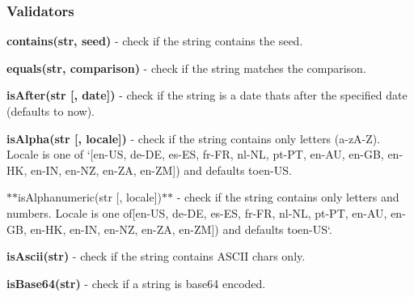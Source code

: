 \subsubsection*{Validators}


\begin{DoxyItemize}
\item {\bfseries contains(str, seed)} -\/ check if the string contains the seed.
\item {\bfseries equals(str, comparison)} -\/ check if the string matches the comparison.
\item {\bfseries is\+After(str \mbox{[}, date\mbox{]})} -\/ check if the string is a date that\textquotesingle{}s after the specified date (defaults to now).
\item {\bfseries is\+Alpha(str \mbox{[}, locale\mbox{]})} -\/ check if the string contains only letters (a-\/z\+A-\/Z). Locale is one of `\mbox{[}\textquotesingle{}en-\/\+US\textquotesingle{}, \textquotesingle{}de-\/\+DE\textquotesingle{}, \textquotesingle{}es-\/\+ES\textquotesingle{}, \textquotesingle{}fr-\/\+FR\textquotesingle{}, \textquotesingle{}nl-\/\+NL\textquotesingle{}, \textquotesingle{}pt-\/\+PT\textquotesingle{}, \textquotesingle{}en-\/\+AU\textquotesingle{}, \textquotesingle{}en-\/\+GB\textquotesingle{}, \textquotesingle{}en-\/\+HK\textquotesingle{}, \textquotesingle{}en-\/\+IN\textquotesingle{}, \textquotesingle{}en-\/\+NZ\textquotesingle{}, \textquotesingle{}en-\/\+ZA\textquotesingle{}, \textquotesingle{}en-\/\+ZM\textquotesingle{}\mbox{]}{\ttfamily ) and defaults to}en-\/\+US{\ttfamily .}
\item {\ttfamily $\ast$$\ast$is\+Alphanumeric(str \mbox{[}, locale\mbox{]})$\ast$$\ast$ -\/ check if the string contains only letters and numbers. Locale is one of}\mbox{[}\textquotesingle{}en-\/\+US\textquotesingle{}, \textquotesingle{}de-\/\+DE\textquotesingle{}, \textquotesingle{}es-\/\+ES\textquotesingle{}, \textquotesingle{}fr-\/\+FR\textquotesingle{}, \textquotesingle{}nl-\/\+NL\textquotesingle{}, \textquotesingle{}pt-\/\+PT\textquotesingle{}, \textquotesingle{}en-\/\+AU\textquotesingle{}, \textquotesingle{}en-\/\+GB\textquotesingle{}, \textquotesingle{}en-\/\+HK\textquotesingle{}, \textquotesingle{}en-\/\+IN\textquotesingle{}, \textquotesingle{}en-\/\+NZ\textquotesingle{}, \textquotesingle{}en-\/\+ZA\textquotesingle{}, \textquotesingle{}en-\/\+ZM\textquotesingle{}\mbox{]}{\ttfamily ) and defaults to}en-\/\+U\+S`.
\item {\bfseries is\+Ascii(str)} -\/ check if the string contains A\+S\+C\+II chars only.
\item {\bfseries is\+Base64(str)} -\/ check if a string is base64 encoded.

\end{DoxyItemize}
